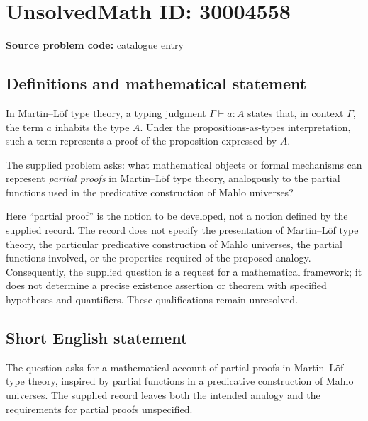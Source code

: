 \documentclass[11pt]{article}
\begin{document}
\section*{UnsolvedMath ID: 30004558}
\textbf{Source problem code:} catalogue entry
\subsection{Definitions and mathematical statement}
In Martin--L\"of type theory, a typing judgment \(\Gamma\vdash a:A\) states that, in context \(\Gamma\), the term \(a\) inhabits the type \(A\). Under the propositions-as-types interpretation, such a term represents a proof of the proposition expressed by \(A\).

The supplied problem asks: what mathematical objects or formal mechanisms can represent \emph{partial proofs} in Martin--L\"of type theory, analogously to the partial functions used in the predicative construction of Mahlo universes?

Here ``partial proof'' is the notion to be developed, not a notion defined by the supplied record. The record does not specify the presentation of Martin--L\"of type theory, the particular predicative construction of Mahlo universes, the partial functions involved, or the properties required of the proposed analogy. Consequently, the supplied question is a request for a mathematical framework; it does not determine a precise existence assertion or theorem with specified hypotheses and quantifiers. These qualifications remain unresolved.
\subsection{Short English statement}
The question asks for a mathematical account of partial proofs in Martin--L\"of type theory, inspired by partial functions in a predicative construction of Mahlo universes. The supplied record leaves both the intended analogy and the requirements for partial proofs unspecified.
\end{document}
